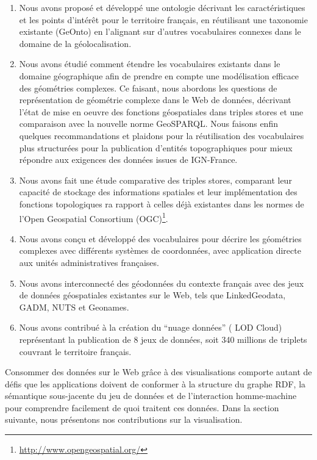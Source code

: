 \documentclass[a4paper,11pt,twoside]{report}
\begin{document}
 \begin{enumerate}
 
  \item  Nous avons proposé et développé une ontologie décrivant les caractéristiques et les points d'intérêt pour le territoire français, en réutilisant une taxonomie existante (GeOnto) en l'alignant sur d'autres vocabulaires connexes dans le domaine de la géolocalisation.
 
  \item  Nous avons étudié comment étendre les vocabulaires existants dans le domaine géographique afin de prendre en compte une modélisation efficace des géométries complexes. Ce faisant, nous abordons les questions de représentation de géométrie complexe dans le Web de données, décrivant l'état de mise en oeuvre des fonctions géospatiales dans triples stores et une comparaison avec la nouvelle norme GeoSPARQL. Nous faisons enfin quelques recommandations et plaidons pour la réutilisation des vocabulaires plus structurées pour la publication d'entités topographiques pour mieux répondre aux exigences des données issues de IGN-France.
 
 \item Nous avons fait une étude comparative des triples stores, comparant leur capacité de stockage des informations spatiales et leur implémentation des fonctions topologiques ra rapport à celles déjà existantes dans les normes de l'Open Geospatial Consortium (OGC)\footnote{\url{http://www.opengeospatial.org/}}.

 \item  Nous avons conçu et développé des vocabulaires pour décrire les géométries complexes avec différents systèmes de coordonnées, avec application directe aux unités administratives françaises.
 

 \item Nous avons interconnecté des géodonnées du contexte français avec des jeux de données géospatiales existantes sur le Web, tels que LinkedGeodata, GADM, NUTS et Geonames.
 
 \item Nous avons contribué à la création du ``nuage données'' ( LOD Cloud) représentant la publication de 8 jeux de données, soit 340 millions de triplets couvrant le territoire français.
 

\end{enumerate}
 
Consommer des données sur le Web grâce à des visualisations comporte autant de défis que les applications doivent de conformer à la structure du graphe RDF, la sémantique sous-jacente du jeu de données et de l'interaction homme-machine pour comprendre facilement de quoi traitent ces données. Dans la section suivante, nous présentons nos contributions sur la visualisation.
\end{document}
